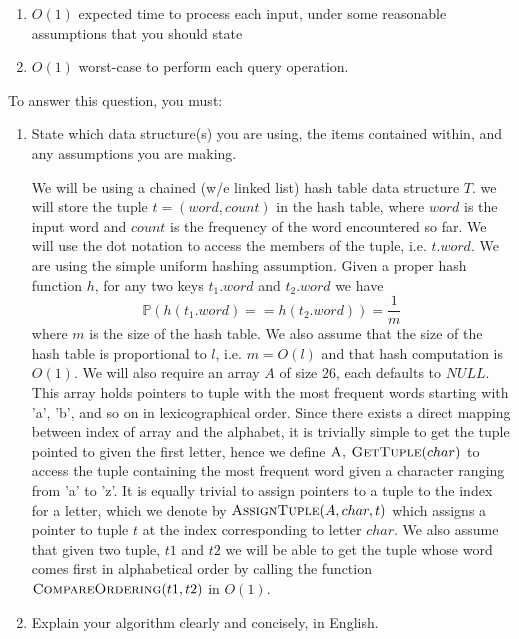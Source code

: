 \documentclass[11pt]{article}
\begin{document}
\begin{enumerate}
  \item $O(1)$ expected time to process each input, under some reasonable assumptions that you should state
  \item $O(1)$ worst-case to perform each query operation.
\end{enumerate}

To answer this question, you must:
\begin{enumerate}
  \item State which data structure(s) you are using, the items contained within, and any assumptions you are making.
  \begin{solution}
    We will be using a chained (w/e linked list) hash table data structure $T$. we will store the tuple $t = (word, count)$ in the hash table, where $word$ is the input word and $count$ is the frequency of the word encountered so far. We will use the dot notation to access the members of the tuple, i.e. $t.word$. We are using the simple uniform hashing assumption. Given a proper hash function $h$, for any two keys $t_1.word$ and $t_2.word$ we have
    \[
      \mathbb{P}(h(t_1.word) == h(t_2.word)) = \frac{1}{m}
    \]
    where $m$ is the size of the hash table. We also assume that the size of the hash table is proportional to $l$, i.e. $m = O(l)$ and that hash computation is $O(1)$. We will also require an array $A$ of size 26, each defaults to $NULL$. This array holds pointers to tuple with the most frequent words starting with 'a', 'b', and so on in lexicographical order. Since there exists a direct mapping between index of array and the alphabet, it is trivially simple to get the tuple pointed to given the first letter, hence we define $\textsc{A, GetTuple}(char)$ to access the tuple containing the most frequent word given a character ranging from 'a' to 'z'. It is equally trivial to assign pointers to a tuple to the index for a letter, which we denote by $\textsc{AssignTuple}(A, char, t)$ which assigns a pointer to tuple $t$ at the index corresponding to letter $char$. We also assume that given two tuple, $t1$ and $t2$ we will be able to get the tuple whose word comes first in alphabetical order by calling the function $\textsc{CompareOrdering}(t1, t2)$ in $O(1)$.
  \end{solution}
  \item Explain your algorithm clearly and concisely, in English.
  \begin{enumerate}

\end{enumerate}
\end{enumerate}
\end{document}
